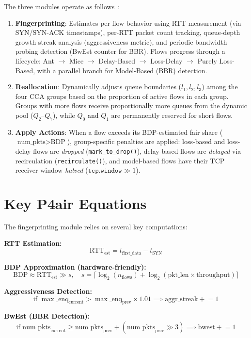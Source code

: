 \documentclass[12pt,a4paper]{report}
\begin{document}
The three modules operate as follows~\cite{p4air}:

\begin{enumerate}
    \item \textbf{Fingerprinting}: Estimates per-flow behavior using RTT measurement (via SYN/SYN-ACK timestamps), per-RTT packet count tracking, queue-depth growth streak analysis (aggressiveness metric), and periodic bandwidth probing detection (BwEst counter for BBR). Flows progress through a lifecycle: Ant $\rightarrow$ Mice $\rightarrow$ Delay-Based $\rightarrow$ Loss-Delay $\rightarrow$ Purely Loss-Based, with a parallel branch for Model-Based (BBR) detection.
    
    \item \textbf{Reallocation}: Dynamically adjusts queue boundaries ($l_1, l_2, l_3$) among the four CCA groups based on the proportion of active flows in each group. Groups with more flows receive proportionally more queues from the dynamic pool ($Q_2$--$Q_7$), while $Q_0$ and $Q_1$ are permanently reserved for short flows.
    
    \item \textbf{Apply Actions}: When a flow exceeds its BDP-estimated fair share ($\text{num\_pkts} > \text{BDP}$), group-specific penalties are applied: loss-based and loss-delay flows are \textit{dropped} (\texttt{mark\_to\_drop()}), delay-based flows are \textit{delayed} via recirculation (\texttt{recirculate()}), and model-based flows have their TCP receiver window \textit{halved} ($\texttt{tcp.window} \gg 1$).
\end{enumerate}

\section{Key P4air Equations}
The fingerprinting module relies on several key computations:

\textbf{RTT Estimation:}
\[
\text{RTT}_{\text{est}} = t_{\text{first\_data}} - t_{\text{SYN}}
\]

\textbf{BDP Approximation (hardware-friendly):}
\[
\text{BDP} \approx \text{RTT}_{\text{est}} \gg s, \quad s = \lceil \log_2(n_{\text{flows}}) + \log_2(\text{pkt\_len} \times \text{throughput}) \rceil
\]

\textbf{Aggressiveness Detection:}
\[
\text{if } \max\_\text{enq}_{\text{current}} > \max\_\text{enq}_{\text{prev}} \times 1.01 \implies \text{aggr\_streak} \mathrel{+}= 1
\]

\textbf{BwEst (BBR Detection):}
\[
\text{if } \text{num\_pkts}_{\text{current}} \geq \text{num\_pkts}_{\text{prev}} + (\text{num\_pkts}_{\text{prev}} \gg 3) \implies \text{bwest} \mathrel{+}= 1
\]
\end{document}
